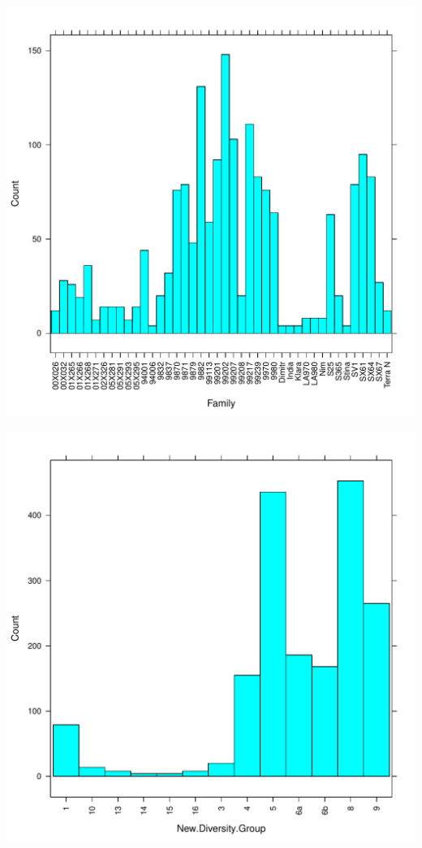 \documentclass{article}\usepackage[]{graphicx}\usepackage[]{color}
\makeatletter
\def\maxwidth{ %
  \ifdim\Gin@nat@width>\linewidth
    \linewidth
  \else
    \Gin@nat@width
  \fi
}
\newenvironment{knitrout}{}{} %
\makeatother
\begin{document}
\begin{knitrout}
{}




{\centering \includegraphics[width=\maxwidth]{figure/HistogramsPredictorVariables-3} 

}




{\centering \includegraphics[width=\maxwidth]{figure/HistogramsPredictorVariables-4} 

}
\end{knitrout}
\end{document}
